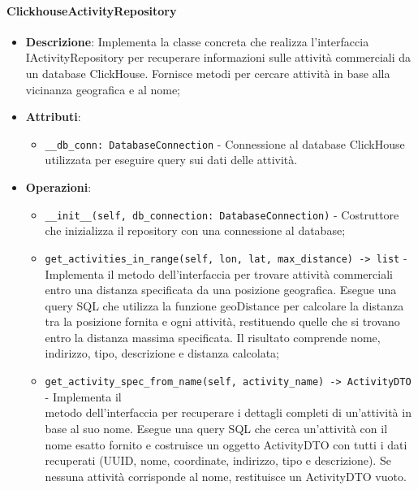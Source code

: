 \documentclass[10pt]{article}
\begin{document}
    \paragraph{ClickhouseActivityRepository}
    \begin{itemize} 
    \item \textbf{Descrizione}: Implementa la classe concreta che realizza l'interfaccia IActivityRepository per recuperare informazioni sulle attività commerciali da un database ClickHouse. Fornisce metodi per cercare attività in base alla vicinanza geografica e al nome;
    \item \textbf{Attributi}:
    \begin{itemize}
        \item \texttt{\_\_db\_conn: DatabaseConnection} - Connessione al database ClickHouse utilizzata per eseguire query sui dati delle attività.
    \end{itemize}
    
    \item \textbf{Operazioni}:
    \begin{itemize}
        \item \texttt{\_\_init\_\_(self, db\_connection: DatabaseConnection)} - Costruttore che inizializza il repository con una connessione al database;
        
        \item \texttt{get\_activities\_in\_range(self, lon, lat, max\_distance) -> list} - Implementa il metodo dell'interfaccia per trovare attività commerciali entro una distanza specificata da una posizione geografica. Esegue una query SQL che utilizza la funzione geoDistance per calcolare la distanza tra la posizione fornita e ogni attività, restituendo quelle che si trovano entro la distanza massima specificata. Il risultato comprende nome, indirizzo, tipo, descrizione e distanza calcolata;
        
        \item \texttt{get\_activity\_spec\_from\_name(self, activity\_name) -> ActivityDTO} - Implementa il\\ metodo dell'interfaccia per recuperare i dettagli completi di un'attività in base al suo nome. Esegue una query SQL che cerca un'attività con il nome esatto fornito e costruisce un oggetto ActivityDTO con tutti i dati recuperati (UUID, nome, coordinate, indirizzo, tipo e descrizione). Se nessuna attività corrisponde al nome, restituisce un ActivityDTO vuoto.
    \end{itemize}
    \end{itemize}
    
\end{document}
